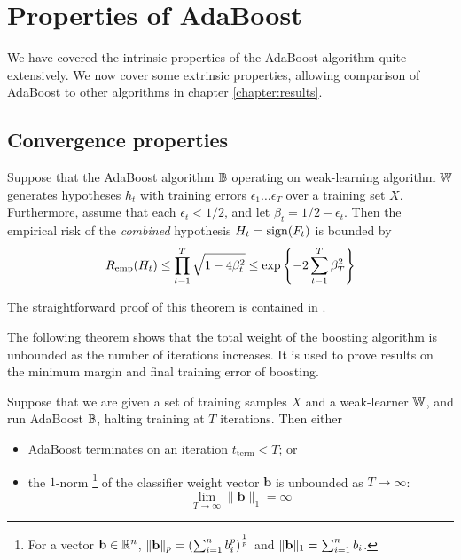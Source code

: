 \section{Properties of AdaBoost}

We have covered the intrinsic properties of the AdaBoost algorithm quite
extensively.  We now cover some extrinsic properties, allowing
comparison of AdaBoost to other algorithms in chapter
\ref{chapter:results}.

\subsection{Convergence properties}

\begin{theorem}
\label{thm:AdaBoost training error convergence}
Suppose that the AdaBoost algorithm $\mathbb{B}$ operating on weak-learning
algorithm $\mathbb{W}$ generates hypotheses $h_t$ with training errors
$\epsilon_1 \ldots \epsilon_T$ over a training set $X$.  Furthermore,
assume that each $\epsilon_t < 1/2$, and let $\beta_t = 1/2 -
\epsilon_t$.  Then the empirical risk of the \emph{combined}
hypothesis $H_t = \mathrm{sign}(F_t)$ is bounded by
%
\begin{equation}
R_{\mathrm{emp}}(H_t) \leq \prod_{t=1}^{T} \sqrt{1 - 4 \beta_t^2} \leq \exp
\left\{ - 2 \sum_{t=1}^T \beta_T^2 \right\}
\end{equation}
\end{theorem}

\proof The straightforward proof of this theorem is contained in
\cite{Freund97}.\vspace{\baselineskip}

The following theorem shows that the total weight of the boosting
algorithm is unbounded as the number of iterations increases.  It is
used to prove results on the minimum margin and final training error
of boosting.

\begin{theorem}
\label{thm:classifier weights unbounded}
Suppose that we are given a set of training samples $X$ and a
weak-learner $\mathbb{W}$, and run AdaBoost $\mathbb{B}$, halting training at $T$
iterations.  Then either
%
\begin{itemize}
\item	AdaBoost terminates on an iteration $t_{\mathrm{term}} < T$;
	or
\item	the $1$-norm%
	\footnote{For a vector $\mathbf{b} \in \mathbb{R}^n$, $\|\mathbf{b}\|_p = \left
	( \sum_{i=1}^{n} b_i^p \right)^{\frac{1}{p}}$ and $\|\mathbf{b}\|_1
	= \sum_{i=1}^{n} b_i$.}
	of the classifier weight vector $\mathbf{b}$ is
	unbounded as $T \rightarrow \infty$:
	\begin{equation}
	\lim_{T \rightarrow \infty} \| \mathbf{b} \|_1 = \infty
	\end{equation}
\end{itemize}
\end{theorem}

